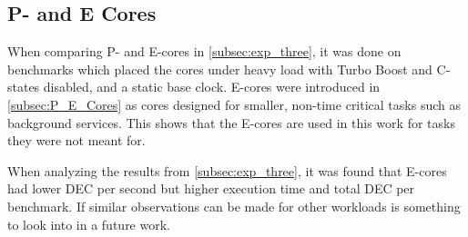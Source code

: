 \subsection{P- and E Cores}

When comparing P- and E-cores in \cref{subsec:exp_three}, it was done on benchmarks which placed the cores under heavy load with Turbo Boost and C-states disabled, and a static base clock. E-cores were introduced in \cref{subsec:P_E_Cores} as cores designed for smaller, non-time critical tasks such as background services. This shows that the E-cores are used in this work for tasks they were not meant for.

When analyzing the results from \cref{subsec:exp_three}, it was found that E-cores had lower DEC per second but higher execution time and total DEC per benchmark. If similar observations can be made for other workloads is something to look into in a future work.
















